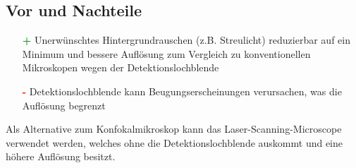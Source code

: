 \subsection*{Vor und Nachteile}
\begin{itemize}
    \item[\textcolor{green}{\textbf{+}}] Unerwünschtes Hintergrundrauschen (z.B. Streulicht) reduzierbar auf ein Minimum und bessere Auflösung zum Vergleich zu konventionellen Mikroskopen wegen der Detektionslochblende
    \item[\textcolor{red}{\textbf{-}}] Detektionslochblende kann Beugungserscheinungen verursachen, was die Auflösung begrenzt
\end{itemize}
Als Alternative zum Konfokalmikroskop kann das Laser-Scanning-Microscope verwendet werden, welches ohne die Detektionslochblende auskommt und eine höhere Auflösung besitzt.